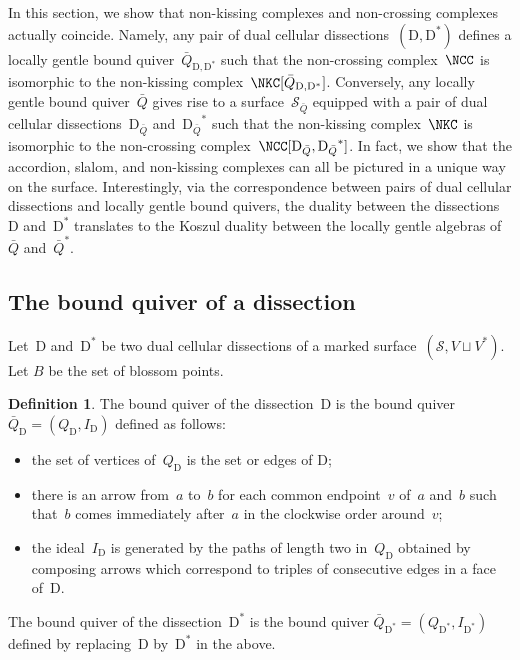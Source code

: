 \documentclass{amsart}
\theoremstyle{definition}
\newtheorem{definition}[theorem]{Definition}
\newcommand{\surface}{\mathcal{S}} %
\newcommand{\dual}{^*} %
\newcommand{\dissection}{\mathrm{D}} %
\begin{document}
In this section, we show that non-kissing complexes and non-crossing complexes actually coincide.
Namely, any pair of dual cellular dissections~$(\dissection, \dissection\dual)$ defines a locally gentle bound quiver~$\bar Q_{\dissection, \dissection\dual}$ such that the non-crossing complex~$\NCC$ is isomorphic to the non-kissing complex~$\NKC[\bar Q_{\dissection, \dissection\dual}]$.
Conversely, any locally gentle bound quiver~$\bar Q$ gives rise to a surface~$\surface_{\bar Q}$ equipped with a pair of dual cellular dissections~$\dissection_{\bar Q}$ and~${\dissection_{\bar Q}}\dual$ such that the non-kissing complex~$\NKC$ is isomorphic to the non-crossing complex~$\NCC[\dissection_{\bar Q}, {\dissection_{\bar Q}}\dual]$.
In fact, we show that the accordion, slalom, and non-kissing complexes can all be pictured in a unique way on the surface.
Interestingly, via the correspondence between pairs of dual cellular dissections and locally gentle bound quivers, the duality between the dissections~$\dissection$ and~$\dissection\dual$ translates to the Koszul duality between the locally gentle algebras of~$\bar Q$ and~$\bar Q\dual$.

\subsection{The bound quiver of a dissection}

Let~$\dissection$ and~$\dissection\dual$ be two dual cellular dissections of a marked surface~$(\surface, V\sqcup V\dual)$.
Let $B$ be the set of blossom points.

\begin{definition}
\label{def:quiverDualDissections}
The bound quiver of the dissection~$\dissection$ is the bound quiver $\bar Q_{\dissection} = (Q_{\dissection}, I_{\dissection})$ defined as follows:
\begin{itemize}
 \item the set of vertices of~$Q_{\dissection}$ is the set or edges of $\dissection$;
 \item there is an arrow from~$a$ to~$b$ for each common endpoint~$v$ of~$a$ and~$b$ such that~$b$ comes immediately after~$a$ in the clockwise order around~$v$;
 \item the ideal~$I_{\dissection}$ is generated by the paths of length two in~$Q_{\dissection}$ obtained by composing arrows which correspond to triples of consecutive edges in a face of~$\dissection$.
\end{itemize}
The bound quiver of the dissection~$\dissection\dual$ is the bound quiver $\bar Q_{\dissection\dual} = (Q_{\dissection\dual}, I_{\dissection\dual})$ defined by replacing~$\dissection$ by~$\dissection\dual$ in the above.
\end{definition}
\end{document}
